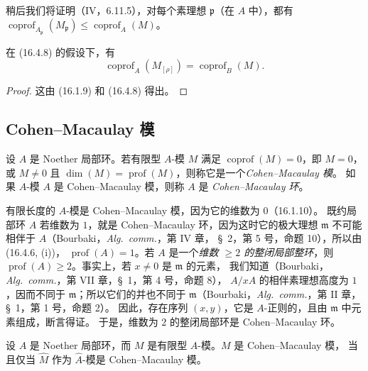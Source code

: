 稍后我们将证明（IV，6.11.5），对每个素理想 $\mathfrak{p}$（在 $A$ 中），都有
$\operatorname{coprof}_{A_{\mathfrak{p}}}(M_{\mathfrak{p}})
\leq\operatorname{coprof}_A(M)$。

\begin{proposition}[16.4.11]
\label{0.16.4.11-fr}
在 (16.4.8) 的假设下，有
\begin{equation}
\label{0.16.4.11.1-fr}
\tag{16.4.11.1}
  \operatorname{coprof}_A(M_{[\rho]})=\operatorname{coprof}_B(M).
\end{equation}
\end{proposition}

\begin{proof}
这由 (16.1.9) 和 (16.4.8) 得出。
\end{proof}

\subsection{Cohen--Macaulay 模}
\label{subsection:0.16.5-fr}

\begin{definition}[16.5.1]
\label{0.16.5.1-fr}
设 $A$ 是 Noether 局部环。若有限型 $A$-模 $M$ 满足
$\operatorname{coprof}(M)=0$，即 $M=0$，或 $M\neq0$ 且
$\dim(M)=\operatorname{prof}(M)$，则称它是一个\emph{Cohen--Macaulay 模}。
如果 $A$-模 $A$ 是 Cohen--Macaulay 模，则称 $A$ 是
\emph{Cohen--Macaulay 环}。
\end{definition}

有限长度的 $A$-模是 Cohen--Macaulay 模，因为它的维数为 $0$（16.1.10）。
既约局部环 $A$ 若维数为 $1$，就是 Cohen--Macaulay 环，因为这时它的极大理想
$\mathfrak{m}$ 不可能相伴于 $A$（Bourbaki，\emph{Alg.~comm.}，第 IV 章，
\S~2，第 5 号，命题 10），所以由 (16.4.6, (i))，
$\operatorname{prof}(A)=1$。若 $A$ 是一个\emph{维数 $\geq2$ 的整闭局部整环}，则
$\operatorname{prof}(A)\geq2$。事实上，若 $x\neq0$ 是 $\mathfrak{m}$ 的元素，
我们知道（Bourbaki，\emph{Alg.~comm.}，第 VII 章，\S~1，第 4 号，命题 8），
$A/xA$ 的相伴素理想高度为 $1$，因而不同于 $\mathfrak{m}$；所以它们的并也不同于
$\mathfrak{m}$（Bourbaki，\emph{Alg.~comm.}，第 II 章，\S~1，第 1 号，命题 2）。
因此，存在序列 $(x,y)$，它是 $A$-正则的，且由 $\mathfrak{m}$ 中元素组成，断言得证。
于是，维数为 $2$ 的整闭局部环是 Cohen--Macaulay 环。

\begin{proposition}[16.5.2]
\label{0.16.5.2-fr}
设 $A$ 是 Noether 局部环，而 $M$ 是有限型 $A$-模。$M$ 是 Cohen--Macaulay 模，
当且仅当 $\widehat M$ 作为 $\widehat A$-模是 Cohen--Macaulay 模。
\end{proposition}

